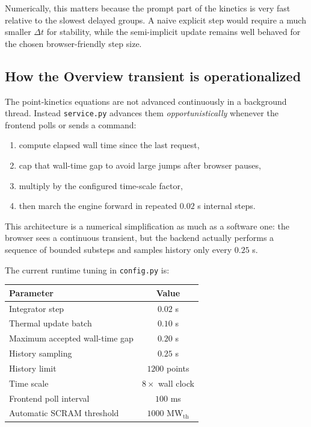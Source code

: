 \documentclass[11pt]{article}
\begin{document}
Numerically, this matters because the prompt part of the kinetics is very fast
relative to the slowest delayed groups.  A naive explicit step would require a
much smaller $\Delta t$ for stability, while the semi-implicit update remains
well behaved for the chosen browser-friendly step size.

\subsection{How the Overview transient is operationalized}

The point-kinetics equations are not advanced continuously in a background
thread.  Instead \texttt{service.py} advances them \emph{opportunistically}
whenever the frontend polls or sends a command:
\begin{enumerate}
  \item compute elapsed wall time since the last request,
  \item cap that wall-time gap to avoid large jumps after browser pauses,
  \item multiply by the configured time-scale factor,
  \item then march the engine forward in repeated $0.02$ s internal steps.
\end{enumerate}

This architecture is a numerical simplification as much as a software one: the
browser sees a continuous transient, but the backend actually performs a sequence
of bounded substeps and samples history only every $0.25$ s.

The current runtime tuning in \texttt{config.py} is:
\begin{center}
\begin{tabular}{lc}
\toprule
Parameter & Value \\
\midrule
Integrator step & $0.02$ s \\
Thermal update batch & $0.10$ s \\
Maximum accepted wall-time gap & $0.20$ s \\
History sampling & $0.25$ s \\
History limit & $1200$ points \\
Time scale & $8\times$ wall clock \\
Frontend poll interval & $100$ ms \\
Automatic SCRAM threshold & $1000$ MW$_{\mathrm{th}}$ \\
\bottomrule
\end{tabular}
\end{center}
\end{document}
